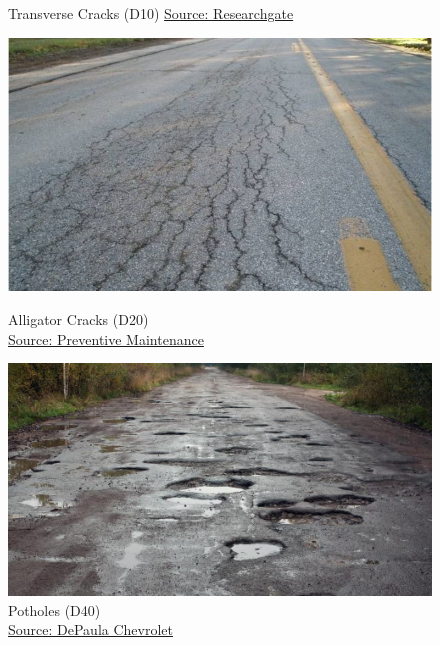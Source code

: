 \begin{figure}[h]
\begin{minipage}{0.45\textwidth}
        \caption{Transverse Cracks (D10) \href{https://www.researchgate.net/figure/Transverse-cracking-in-pavement-structure-with-semi-rigid-surface-layer_fig2_270808511}{Source: Researchgate}}
    \end{minipage}
    \vfill
    \begin{minipage}{0.45\textwidth}
        \centering
        \includegraphics[width=\linewidth]{figures/aligator.jpeg}
        \caption{Alligator Cracks (D20) \\        \href{https://bocapalmbeachsealcoating.com/asphalt-fatigue-cracking/}{Source: Preventive Maintenance}}
    \end{minipage}
    \hfill
    \begin{minipage}{0.45\textwidth}
        \centering
        \includegraphics[width=\linewidth]{figures/potholes1.jpg}
        \caption{Potholes (D40)\\        \href{https://www.depaulachevrolet.com/pothole-damage-that-sinking-feeling-and-what-to-do-about-it/}{Source: DePaula Chevrolet}}
    \end{minipage}
    \label{fig:types of cracks}
\end{figure}

